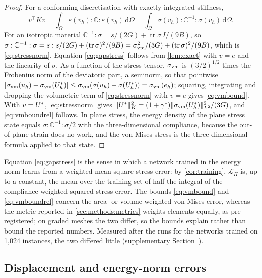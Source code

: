 \begin{proof}
For a conforming discretisation with exactly integrated stiffness,
\begin{equation}
v^{\top}Kv=\int_\Omega\varepsilon(v_h):\mathbb{C}:\varepsilon(v_h)\,\mathrm{d}\Omega
=\int_\Omega\sigma(v_h):\mathbb{C}^{-1}:\sigma(v_h)\,\mathrm{d}\Omega .
\label{eq:kcompliance}
\end{equation}
For an isotropic
material $\mathbb{C}^{-1}:\sigma=s/(2G)+\operatorname{tr}\sigma\,I/(9B)$, so
$\sigma:\mathbb{C}^{-1}:\sigma=s:s/(2G)+(\operatorname{tr}\sigma)^2/(9B)
=\sigma_{\mathrm{vm}}^2/(3G)+(\operatorname{tr}\sigma)^2/(9B)$, which is \eqref{eq:stressnorm}. Equation \eqref{eq:gapstress}
follows from \cref{lem:exact} with $v=e$ and the linearity of $\sigma$. As a function of
the stress tensor, $\sigma_{\mathrm{vm}}$ is $(3/2)^{1/2}$ times the Frobenius norm of the deviatoric part,
a seminorm, so that pointwise
$\lvert\sigma_{\mathrm{vm}}(u_h)-\sigma_{\mathrm{vm}}(U^{\ast}_h)\rvert\le\sigma_{\mathrm{vm}}(\sigma(u_h)-\sigma(U^{\ast}_h))=\sigma_{\mathrm{vm}}(e_h)$;
squaring, integrating and dropping the volumetric term of \eqref{eq:stressnorm} with $v=e$
gives \eqref{eq:vmbound}. With $v=U^{\ast}$, \eqref{eq:stressnorm} gives
$\lVert U^{\ast}\rVert_K^2=(1+\gamma^\ast)\lVert\sigma_{\mathrm{vm}}(U^{\ast}_h)\rVert_{L^2}^2/(3G)$, and
\eqref{eq:vmboundrel} follows. In plane stress, the energy density of the plane stress
state equals $\sigma:\mathbb{C}^{-1}:\sigma/2$ with the three-dimensional compliance,
because the out-of-plane strain does no work, and the von Mises stress is the
three-dimensional formula applied to that state.
\end{proof}

Equation \eqref{eq:gapstress} is the sense in which a network trained in the energy norm
learns from a weighted mean-square stress error: by \cref{cor:training}, $\mathcal{L}_\Pi$
is, up to a constant, the mean over the training set of half the integral of the
compliance-weighted squared stress error. The bounds \eqref{eq:vmbound} and
\eqref{eq:vmboundrel} concern the area- or volume-weighted von Mises error, whereas the
metric reported in \cref{sec:methods:metrics} weights elements equally, as pre-registered;
on graded meshes the two differ, so the bounds explain rather than bound the reported
numbers. Measured after the runs for the networks trained on 1,024 instances, the two
differed little (supplementary Section~\SuppRepro).

\subsection{Displacement and energy-norm errors}\label{sec:theory:metrics}

